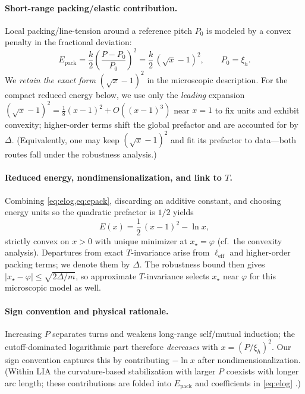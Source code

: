 \documentclass[11pt]{article}
\theoremstyle{remark}
\theoremstyle{definition}
\begin{document}
\paragraph{Short-range packing/elastic contribution.}
Local packing/line-tension around a reference pitch $P_0$ is modeled by a convex penalty in the fractional deviation:
\begin{equation}
E_{\text{pack}}
=\frac{k}{2}\left(\frac{P-P_0}{P_0}\right)^2
=\frac{k}{2}\,(\sqrt{x}-1)^2,
\qquad P_0=\xi_h.
\label{eq:epack}
\end{equation}
We \emph{retain the exact form} $(\sqrt{x}-1)^2$ in the microscopic description. For the compact reduced energy below, we use only the \emph{leading} expansion $(\sqrt{x}-1)^2=\tfrac18(x-1)^2+O((x-1)^3)$ near $x=1$ to fix units and exhibit convexity; higher-order terms shift the global prefactor and are accounted for by $\Delta$. (Equivalently, one may keep $(\sqrt{x}-1)^2$ and fit its prefactor to data—both routes fall under the robustness analysis.)

\paragraph{Reduced energy, nondimensionalization, and link to $T$.}
Combining \cref{eq:elog,eq:epack}, discarding an additive constant, and choosing energy units so the quadratic prefactor is $1/2$ yields
\begin{equation}
E(x) = \frac{1}{2}\,(x-1)^2 - \ln x,
\label{eq:reduced-energy}
\end{equation}
strictly convex on $x>0$ with unique minimizer at $x_\star=\varphi$ (cf.\ the convexity analysis). Departures from exact $T$-invariance arise from $\ell_{\mathrm{eff}}$ and higher-order packing terms; we denote them by $\Delta$. The robustness bound then gives
$|x_\star-\varphi|\le \sqrt{2\Delta/m}$, so approximate $T$-invariance selects $x_\star$ near $\varphi$ for this microscopic model as well.

\paragraph{Sign convention and physical rationale.}
Increasing $P$ separates turns and weakens long-range self/mutual induction; the cutoff-dominated logarithmic part therefore \emph{decreases} with $x=(P/\xi_h)^2$. Our sign convention captures this by contributing $-\ln x$ after nondimensionalization. (Within LIA the curvature-based stabilization with larger $P$ coexists with longer arc length; these contributions are folded into $E_{\text{pack}}$ and coefficients in \cref{eq:elog} \cite{Widnall1972,FukumotoOkulov2005}.)
\end{document}

